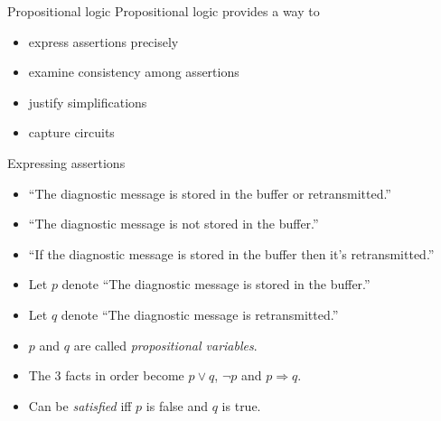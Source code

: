 \documentclass[style=sailor,size=12pt]{powerdot}
\begin{document}

\begin{wideslide}[bm=,toc=]{Propositional logic}
Propositional logic provides a way to
\begin{itemize}
\item express assertions precisely
\item examine consistency among assertions
\item justify simplifications
\item capture circuits
\end{itemize}
\end{wideslide}

\begin{wideslide}[bm=,toc=]{Expressing assertions}
\begin{itemize}
\item ``The diagnostic message is stored in the buffer or retransmitted.''
\item ``The diagnostic message is not stored in the buffer.''
\item ``If the diagnostic message is stored in the buffer then it's retransmitted.''
\item Let $p$ denote ``The diagnostic message is stored in the buffer.''
\item Let $q$ denote ``The diagnostic message is retransmitted.''
\item $p$ and $q$ are called {\em propositional variables\/}.
\item The 3 facts in order become $p\vee q$, $\neg p$ and $p\Rightarrow q$.
\item Can be {\em satisfied\/} iff $p$ is false and $q$ is true.
\end{itemize}
\end{wideslide}
\end{document}
